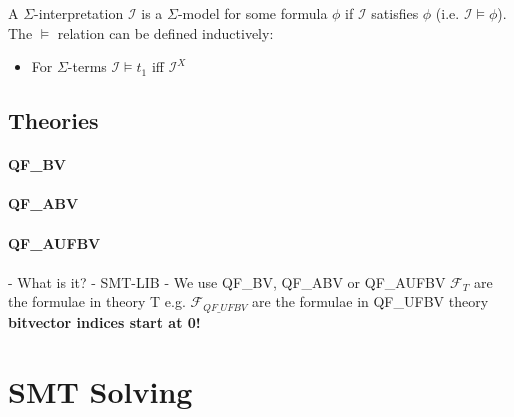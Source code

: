 \begin{definition}
A $\Sigma$-interpretation $\mathcal{I}$ is a $\Sigma$-model for some formula $\phi$ if $\mathcal{I}$ satisfies $\phi$ (i.e. $\mathcal{I}\models\phi$).\\
The $\models$ relation can be defined inductively:
\begin{itemize}
    \item For $\Sigma$-terms $\mathcal{I}\models t_1$ iff $\mathcal{I}^X$
\end{itemize}
\end{definition}

\subsection{Theories}

\paragraph{QF\_BV}

\paragraph{QF\_ABV}

\paragraph{QF\_AUFBV}


 
\paragraph{}
- What is it?
- SMT-LIB
- We use QF\_BV, QF\_ABV or QF\_AUFBV
$\mathcal{F}_{T}$ are the formulae in theory T e.g. $\mathcal{F}_{QF\_UFBV}$ are the formulae in QF\_UFBV theory
\textbf{bitvector indices start at 0!}
\section{SMT Solving}